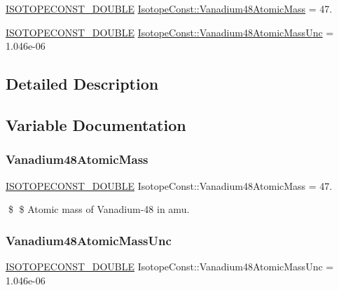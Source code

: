 \begin{DoxyCompactItemize}
\item 
\mbox{\hyperlink{group___isotope_const-_macros_ga8f45a7272ce02c0b4c65c44636ed719a}{I\+S\+O\+T\+O\+P\+E\+C\+O\+N\+S\+T\+\_\+\+D\+O\+U\+B\+LE}} \mbox{\hyperlink{group___isotope_const-_vanadium-_v48_gad1bbb9404ba69a013e2a1dde5a6677cc}{Isotope\+Const\+::\+Vanadium48\+Atomic\+Mass}} = 47.
\item 
\mbox{\hyperlink{group___isotope_const-_macros_ga8f45a7272ce02c0b4c65c44636ed719a}{I\+S\+O\+T\+O\+P\+E\+C\+O\+N\+S\+T\+\_\+\+D\+O\+U\+B\+LE}} \mbox{\hyperlink{group___isotope_const-_vanadium-_v48_ga488c2a25c9ef4d2a401ec42a1b691ccd}{Isotope\+Const\+::\+Vanadium48\+Atomic\+Mass\+Unc}} = 1.\+046e-\/06
\end{DoxyCompactItemize}


\subsection{Detailed Description}


\subsection{Variable Documentation}
\mbox{\label{group___isotope_const-_vanadium-_v48_gad1bbb9404ba69a013e2a1dde5a6677cc}} 
\subsubsection{\texorpdfstring{Vanadium48\+Atomic\+Mass}{Vanadium48AtomicMass}}
{\footnotesize\ttfamily \mbox{\hyperlink{group___isotope_const-_macros_ga8f45a7272ce02c0b4c65c44636ed719a}{I\+S\+O\+T\+O\+P\+E\+C\+O\+N\+S\+T\+\_\+\+D\+O\+U\+B\+LE}} Isotope\+Const\+::\+Vanadium48\+Atomic\+Mass = 47.}

\$ \$ Atomic mass of Vanadium-\/48 in amu. \mbox{\label{group___isotope_const-_vanadium-_v48_ga488c2a25c9ef4d2a401ec42a1b691ccd}} 
\subsubsection{\texorpdfstring{Vanadium48\+Atomic\+Mass\+Unc}{Vanadium48AtomicMassUnc}}
{\footnotesize\ttfamily \mbox{\hyperlink{group___isotope_const-_macros_ga8f45a7272ce02c0b4c65c44636ed719a}{I\+S\+O\+T\+O\+P\+E\+C\+O\+N\+S\+T\+\_\+\+D\+O\+U\+B\+LE}} Isotope\+Const\+::\+Vanadium48\+Atomic\+Mass\+Unc = 1.\+046e-\/06}

